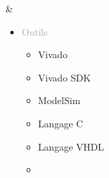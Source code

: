 \documentclass{article}
\begin{document}
\begin{tabular}
\begin{itemize}
\begin{itemize}
\begin{itemize}
            \end{itemize}
        \end{itemize}
    \end{itemize}
    &
    \begin{itemize}
        [label={}, topsep=8pt, partopsep=0pt, itemsep=0.5pt, parsep=2pt,after=\vspace*{-\baselineskip}]
        \setlength{\itemsep}{10pt}
        \item \textcolor{darkGray}{Outils}
        \begin{itemize}
        [label={\textcolor{gray!80}{\checkmark}}, topsep=8pt, partopsep=0pt, itemsep=0.5pt, parsep=2pt,after=\vspace*{-\baselineskip}] 
            
            \item \textcolor{gray!80}{Vivado}
            \item \textcolor{gray!80}{Vivado SDK}
            \item \textcolor{gray!80}{ModelSim}
            \item \textcolor{gray!80}{Langage C}
            \item \textcolor{gray!80}{Langage VHDL}
            \item[\textcolor{white}{\checkmark}] \textcolor{gray!80}{} %

        \end{itemize}
    \end{itemize}
\end{tabular}


\begin{center}
\end{center}
\end{document}
